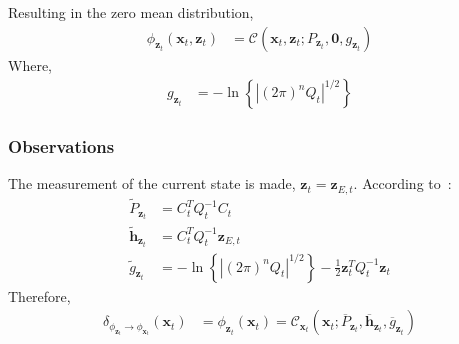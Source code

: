 Resulting in the zero mean distribution,
\begin{align}
\phi_{ \pmb{z}_{t} } ( \pmb{x}_{t}, \pmb{z}_{t} )&= \mathcal{C} \left( \pmb{x}_{t}, \pmb{z}_{t} ; P_{\pmb{z}_t}, \pmb{0} , g_{\pmb{z}_t} \right) 
\end{align}
Where,
\begin{align}
g_{\pmb{z}_{t}} &= - \ln{ \left\{ |(2 \pi)^{n} Q_{t} |^{1/2} \right\} }
\end{align}

\subsubsection{Observations}
\label{subsubsection:observations}
The measurement of the current state is made, $\pmb{z}_{t} = \pmb{z}_{E, t}$. According to~\cite{Koller_canonical}:
\begin{align}
\widetilde{P}_{\pmb{z}_{t}} &= C_{t}^{T} Q_{t}^{-1} C_{t} \\
\widetilde{\pmb{h}}_{\pmb{z}_{t}} &= C_{t}^{T} Q_{t}^{-1}  \pmb{z}_{E, t} \\
\widetilde{g}_{\pmb{z}_{t}} &= - \ln{ \left\{ |(2 \pi)^{n} Q_{t} |^{1/2} \right\} } - \frac{1}{2} \pmb{z}_{t}^{T} Q_{t}^{-1} \pmb{z}_{t}
\end{align}
Therefore,
\begin{align}
\delta_{\phi_{\pmb{z}_{t}} \rightarrow \phi_{\pmb{x}_{t}}} (\pmb{x}_{t}) &= \phi_{ \pmb{z}_{t} } ( \pmb{x}_{t} ) = \mathcal{C}_{\pmb{x}_{t}} \left( \pmb{x}_{t}; \overline{P}_{\pmb{z}_{t}}, \overline{\pmb{h}}_{\pmb{z}_{t}} , \overline{g}_{\pmb{z}_{t}}  \right) 
\end{align}

